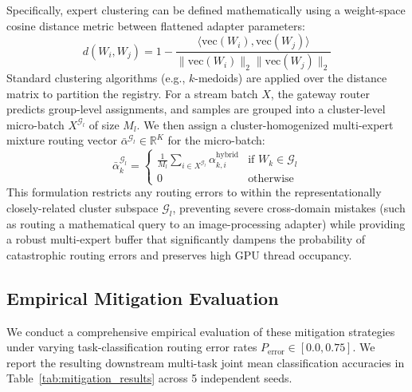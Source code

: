 \documentclass{article}
\theoremstyle{plain}
\theoremstyle{definition}
\theoremstyle{remark}
\begin{document}
Specifically, expert clustering can be defined mathematically using a weight-space cosine distance metric between flattened adapter parameters:
\begin{equation}
d(W_i, W_j) = 1 - \frac{\langle \text{vec}(W_i), \text{vec}(W_j) \rangle}{\|\text{vec}(W_i)\|_2 \|\text{vec}(W_j)\|_2}
\end{equation}
Standard clustering algorithms (e.g., $k$-medoids) are applied over the distance matrix to partition the registry. For a stream batch $X$, the gateway router predicts group-level assignments, and samples are grouped into a cluster-level micro-batch $X^{\mathcal{G}_l}$ of size $M_l$. We then assign a cluster-homogenized multi-expert mixture routing vector $\bar{\alpha}^{\mathcal{G}_l} \in \mathbb{R}^K$ for the micro-batch:
\begin{equation}
\bar{\alpha}_{k}^{\mathcal{G}_l} = \begin{cases} 
\frac{1}{M_l} \sum_{i \in X^{\mathcal{G}_l}} \alpha^{\text{hybrid}}_{k, i} & \text{if } W_k \in \mathcal{G}_l \\ 
0 & \text{otherwise} \end{cases}
\end{equation}
This formulation restricts any routing errors to within the representationally closely-related cluster subspace $\mathcal{G}_l$, preventing severe cross-domain mistakes (such as routing a mathematical query to an image-processing adapter) while providing a robust multi-expert buffer that significantly dampens the probability of catastrophic routing errors and preserves high GPU thread occupancy.

\subsection{Empirical Mitigation Evaluation}
We conduct a comprehensive empirical evaluation of these mitigation strategies under varying task-classification routing error rates $P_{\text{error}} \in [0.0, 0.75]$. We report the resulting downstream multi-task joint mean classification accuracies in Table~\ref{tab:mitigation_results} across 5 independent seeds.
\end{document}
